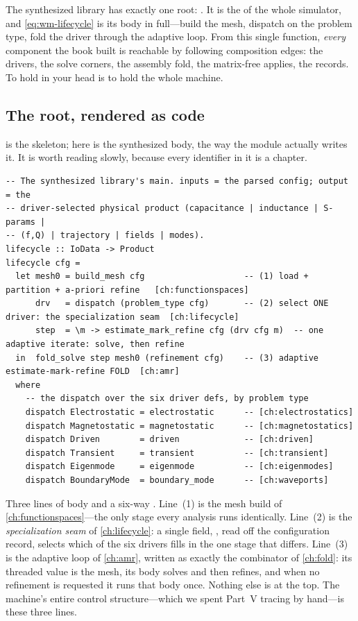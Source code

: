\begin{keyidea}
The synthesized library has exactly one root: . It is the 
of the whole simulator, and \cref{eq:wm-lifecycle} is its body in full---build the
mesh, dispatch on the problem type, fold the driver through the adaptive loop. From
this single function, \emph{every} component the book built is reachable by following
composition edges: the drivers, the solve corners, the assembly fold, the
matrix-free applies, the records. To hold  in your head is to hold
the whole machine.
\end{keyidea}

\subsection{The root, rendered as code}
\label{sec:wm-root-code}

 is the skeleton; here is the synthesized body, the way the
 module actually writes it. It is worth reading slowly, because every
identifier in it is a chapter.

\begin{lstlisting}[style=l4style]
-- The synthesized library's main. inputs = the parsed config; output = the
-- driver-selected physical product (capacitance | inductance | S-params |
-- (f,Q) | trajectory | fields | modes).
lifecycle :: IoData -> Product
lifecycle cfg =
  let mesh0 = build_mesh cfg                    -- (1) load + partition + a-priori refine   [ch:functionspaces]
      drv   = dispatch (problem_type cfg)       -- (2) select ONE driver: the specialization seam  [ch:lifecycle]
      step  = \m -> estimate_mark_refine cfg (drv cfg m)  -- one adaptive iterate: solve, then refine
  in  fold_solve step mesh0 (refinement cfg)    -- (3) adaptive estimate-mark-refine FOLD  [ch:amr]
  where
    -- the dispatch over the six driver defs, by problem type
    dispatch Electrostatic = electrostatic      -- [ch:electrostatics]
    dispatch Magnetostatic = magnetostatic      -- [ch:magnetostatics]
    dispatch Driven        = driven             -- [ch:driven]
    dispatch Transient     = transient          -- [ch:transient]
    dispatch Eigenmode     = eigenmode          -- [ch:eigenmodes]
    dispatch BoundaryMode  = boundary_mode      -- [ch:waveports]
\end{lstlisting}

\noindent Three lines of body and a six-way . Line~(1) is the mesh
build of \cref{ch:functionspaces}---the only stage every analysis runs identically.
Line~(2) is the \emph{specialization seam} of \cref{ch:lifecycle}: a single
field, , read off the configuration record, selects which of the
six drivers fills in the one stage that differs. Line~(3) is the adaptive loop of
\cref{ch:amr}, written as exactly the  combinator of \cref{ch:fold}:
its threaded value is the mesh, its body solves and then refines, and when no
refinement is requested it runs that body once. Nothing else is at the top. The
machine's entire control structure---which we spent Part~V tracing by hand---is these
three lines.

